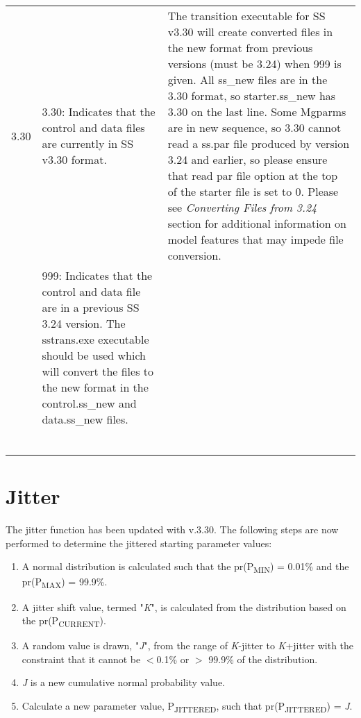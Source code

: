 \begin{landscape}
\begin{longtable}{p{1.5cm} p{7cm} p{12.5cm}}
 \hline
 \hypertarget{Convert}{3.30} & 3.30: Indicates that the control and data files are currently in SS v3.30 format. 
	 & \multirow{1}{1cm}[-0.1cm]{\parbox{12.5cm}{The transition executable for SS v3.30 will create converted files in the new format from previous versions (must be 3.24) when 999 is given.  All ss\_new files are in the 3.30 format, so starter.ss\_new has 3.30 on the last line.  Some Mgparms are in new sequence, so 3.30 cannot read a ss.par file produced by version 3.24 and earlier, so please ensure that read par file option at the top of the starter file is set to 0. Please see \hypertarget{ConvIssues} {\textit{Converting Files from 3.24} section for additional information on model features that may impede file conversion.}}}\\
     & \multirow{1}{1cm}[-0.1cm]{\parbox{7cm}{999: Indicates that the control and data file are in a previous SS 3.24 version.  The sstrans.exe executable should be used which will convert the files to the new format in the control.ss\_new and data.ss\_new files.}}  & \\  
     & & \\  
	 & & \\
     & & \\
   	 & & \\
     & & \\
     & & \\	
\end{longtable}
\end{landscape}
\restoregeometry

\section{Jitter}
\hypertarget{Jitter}{}
The jitter function has been updated with v.3.30.  The following steps are now performed to determine the jittered starting parameter values:
\begin{enumerate}
	\item A normal distribution is calculated such that the pr(P\textsubscript{MIN}) = 0.01\% and the pr(P\textsubscript{MAX}) = 99.9\%.
	\item A jitter shift value, termed "\textit{K}", is calculated from the distribution based on the pr(P\textsubscript{CURRENT}).
	\item A random value is drawn, "\textit{J}", from the range of \textit{K}-jitter to \textit{K}+jitter with the constraint that it cannot be $<$0.1\% or $>$ 99.9\% of the distribution.
	\item \textit{J} is a new cumulative normal probability value.
	\item Calculate a new parameter value, P\textsubscript{JITTERED}, such that pr(P\textsubscript{JITTERED}) = \textit{J}.
\end{enumerate}

